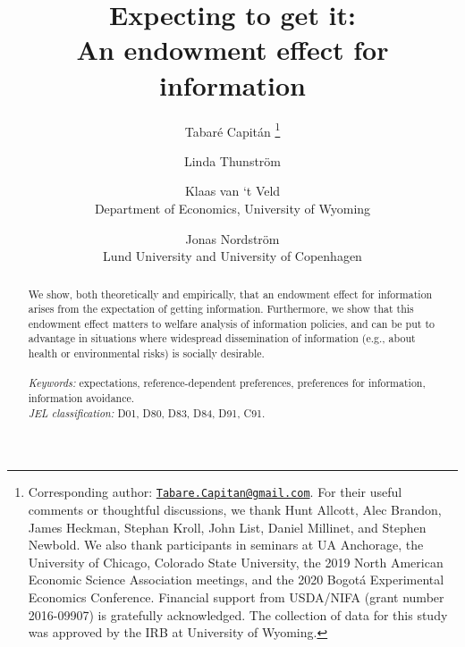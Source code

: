 
\title{\vspace{-3cm}
      Expecting to get it: \\ An endowment effect for information
      }


\author{Tabaré Capitán
          \thanks{Corresponding author: \href{mailto:Tabare.Capitan@gmail.com}{\texttt{Tabare.Capitan@gmail.com}}. For their useful comments or thoughtful discussions, we thank Hunt Allcott, Alec Brandon, James Heckman, Stephan Kroll, John List, Daniel Millinet, and Stephen Newbold. We also thank participants in seminars at UA Anchorage, the University of Chicago, Colorado State University, the 2019 North American Economic Science Association meetings, and the 2020 Bogotá Experimental Economics Conference. Financial support from USDA/NIFA (grant number 2016-09907) is gratefully acknowledged. The collection of data for this study was approved by the IRB at University of Wyoming.}
        \and
        Linda Thunström
        \and
        Klaas van ‘t Veld
          \\ \small{Department of Economics, University of Wyoming}
        \and
        Jonas Nordström
          \\ \small{Lund University and University of Copenhagen}
        }

\maketitle

\thispagestyle{empty}   %

\begin{abstract}

\noindent
We show, both theoretically and empirically, that an endowment effect for information arises from the expectation of getting information. Furthermore, we show that this endowment effect matters to welfare analysis of information policies, and can be put to advantage in situations where widespread dissemination of information (e.g., about health or environmental risks) is socially desirable.
\\
\\
\textit{Keywords:} expectations, reference-dependent preferences, preferences for information, information avoidance.
\\
\textit{JEL classification:} D01, D80, D83, D84, D91, C91.

\end{abstract}

\clearpage

